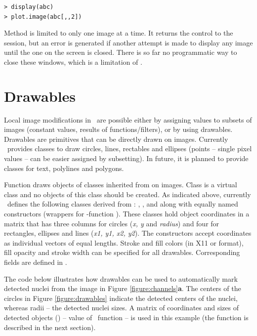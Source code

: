 \begin{verbatim}
> display(abc)
> plot.image(abc[,,2])
\end{verbatim}

Method  is limited to only one image at a time. It returns the control to the \R{} session, but an error is generated if another attempt is made to display any image until the one on the screen is closed. There is so far no programmatic way to close these windows, which is a limitation of .

\section*{Drawables}

Local image modifications in \EBImage\ are possible either by assigning values to subsets of images (constant values, results of functions/filters), or by using drawables. Drawables are primitives that can be directly drawn on images. Currently \EBImage\ provides classes to draw circles, lines, rectables and ellipses (points -- single pixel values -- can be easier assigned by subsetting). In future, it is planned to provide classes for text, polylines and polygons.

Function  draws objects of classes inherited from  on images. Class  is a virtual class and no objects of this class should be created. As indicated above, currently \EBImage\ defines the following classes derived from : , ,  and  along with equally named constructors (wrappers for \R{}-function ). These classes hold object coordinates in a matrix that has three columns for circles ({\em x, y} and {\em radius}) and four for rectangles, ellipses and lines ({\em x1, y1, x2, y2}). The constructors accept coordinates as individual vectors of equal lengths. Stroke and fill colors (in X11 or \R{} format), fill opacity and stroke width can be specified for all drawables. Corresponding fields are defined in .

The code below illustrates how drawables can be used to automatically mark detected nuclei from the image in Figure \ref{figure:channels}{\bf a}. The centers of the circles in Figure \ref{figure:drawables} indicate the detected centers of the nuclei, whereas radii -- the detected nuclei sizes. A matrix of coordinates and sizes of detected objects () -- value of \EBImage\ function  -- is used in this example (the function is described in the next section).


